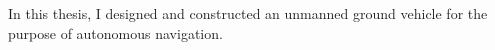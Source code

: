 \begin{abstractpage}
In this thesis, I designed and constructed an unmanned ground vehicle for the purpose of autonomous navigation. 
\end{abstractpage}